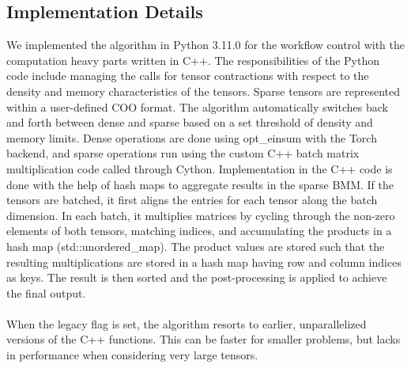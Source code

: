 \subsection{Implementation Details}
We implemented the algorithm in Python 3.11.0 for the workflow control with the computation heavy 
parts written in C++. The responsibilities of the Python code include managing the calls for 
tensor contractions with respect to the density and memory characteristics of the tensors. Sparse 
tensors are represented within a user-defined COO format. The algorithm automatically switches 
back and forth between dense and sparse based on a set threshold of density and memory limits. 
Dense operations are done using opt\_einsum with the Torch backend, and sparse operations run using 
the custom C++ batch matrix multiplication code called through Cython.
Implementation in the C++ code is done with the help of hash maps to aggregate results in the sparse 
BMM. If the tensors are batched, it first aligns the entries for each tensor along the batch 
dimension. In each batch, it multiplies matrices by cycling through the non-zero elements of both 
tensors, matching indices, and accumulating the products in a hash map (std::unordered\_map). 
The product values are stored such that the resulting multiplications are stored in a hash map 
having row and column indices as keys. The result is then sorted and the post-processing is applied 
to achieve the final output.
\\
\\
When the legacy flag is set, the algorithm resorts to earlier, unparallelized versions of the C++ 
functions. This can be faster for smaller problems, but lacks in performance when considering very large
tensors.